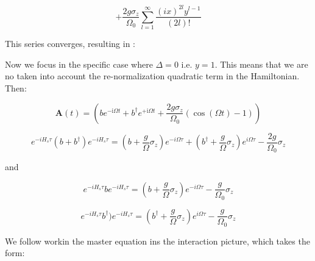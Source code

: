 \documentclass[%
preprint,
onecolumn,
notitlepag,
 amsmath,amssymb,
 aps,
 pra,
]{revtex4-2}
\begin{document}
\begin{equation*}
    + \frac{2 g \sigma_z}{\Omega_0} \sum_{l=1}^{\infty}\frac{(i x)^{2 l} y^{l-1}}{(2 l) !}
\end{equation*}


This series converges, resulting in :







Now we focus in the specific case where $\Delta=0$ i.e. $y=1$. This means that we are no taken into account the re-normalization quadratic term in the Hamiltonian. Then:


\begin{equation}\boldsymbol{A}(t)=\left(b e^{-\mathrm{i} \Omega t}+b^{\dagger} e^{+\mathrm{i} \Omega t}    +  \frac{2 g \sigma_z}{\Omega_0} \left( \cos (\Omega t) -1 \right) \right)\end{equation}

\begin{equation}
e^{-i H_{s} \tau}\left(b+b^{\dagger}\right) e^{-i H_{s} \tau}=\left(b+\frac{g}{\Omega} \sigma_{z}\right) e^{- i \Omega \tau}+\left(b^{\dagger}+\frac{g}{\Omega} \sigma_{z}\right) e^{i \Omega  \tau }-\frac{2 g}{ \Omega_{0}} \sigma_{z}
\end{equation}

and

\begin{equation}
e^{-i H_{s} \tau} b e^{-i H_{s} \tau}=\left(b+\frac{g}{\Omega} \sigma_{z}\right) e^{- i \Omega \tau}-\frac{ g}{ \Omega_{0}} \sigma_{z}
\end{equation}


\begin{equation}
e^{-i H_{s} \tau}b^{\dagger})e^{-i H_{s} \tau}=   \left( b^{\dagger} + \frac{g}{\Omega} \sigma_{z}\right) e^{i \Omega  \tau }-\frac{ g}{ \Omega_{0}} \sigma_{z}
\end{equation}


We follow workin the master equation ins the interaction picture, which takes the form:
\end{document}
